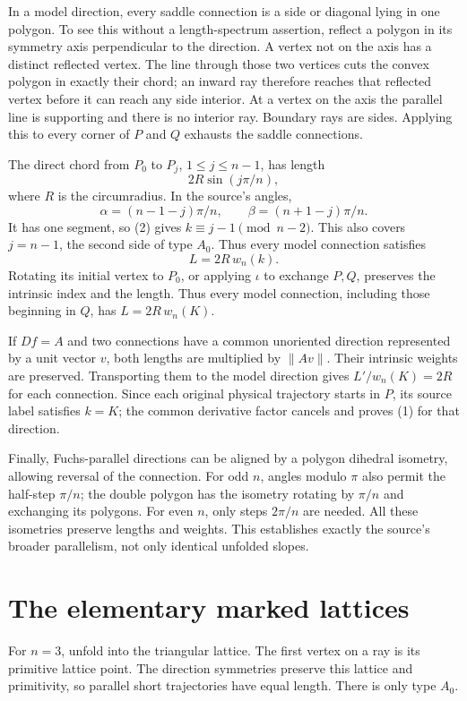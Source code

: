 \documentclass[11pt]{article}
\begin{document}
In a model direction, every saddle connection is a side or diagonal lying in one polygon. To see this without a length-spectrum assertion, reflect a polygon in its symmetry axis perpendicular to the direction. A vertex not on the axis has a distinct reflected vertex. The line through those two vertices cuts the convex polygon in exactly their chord; an inward ray therefore reaches that reflected vertex before it can reach any side interior. At a vertex on the axis the parallel line is supporting and there is no interior ray. Boundary rays are sides. Applying this to every corner of \(P\) and \(Q\) exhausts the saddle connections.

The direct chord from \(P_0\) to \(P_j\), \(1\le j\le n-1\), has length
\[
2R\sin(j\pi/n),
\tag{11}
\]
where \(R\) is the circumradius. In the source's angles,
\[
\alpha=(n-1-j)\pi/n,\qquad
\beta=(n+1-j)\pi/n.
\]
It has one segment, so (2) gives \(k\equiv j-1\pmod{n-2}\). This also covers \(j=n-1\), the second side of type \(A_0\). Thus every model connection satisfies
\[
L=2R\,w_n(k).
\tag{12}
\]
Rotating its initial vertex to \(P_0\), or applying \(\iota\) to exchange \(P,Q\), preserves the intrinsic index and the length. Thus every model connection, including those beginning in \(Q\), has \(L=2R\,w_n(K)\).

If \(D f=A\) and two connections have a common unoriented direction represented by a unit vector \(v\), both lengths are multiplied by \(\|Av\|\). Their intrinsic weights are preserved. Transporting them to the model direction gives \(L'/w_n(K)=2R\) for each connection. Since each original physical trajectory starts in \(P\), its source label satisfies \(k=K\); the common derivative factor cancels and proves (1) for that direction.

Finally, Fuchs-parallel directions can be aligned by a polygon dihedral isometry, allowing reversal of the connection. For odd \(n\), angles modulo \(\pi\) also permit the half-step \(\pi/n\); the double polygon has the isometry rotating by \(\pi/n\) and exchanging its polygons. For even \(n\), only steps \(2\pi/n\) are needed. All these isometries preserve lengths and weights. This establishes exactly the source's broader parallelism, not only identical unfolded slopes.

\section{The elementary marked lattices}

For \(n=3\), unfold into the triangular lattice. The first vertex on a ray is its primitive lattice point. The direction symmetries preserve this lattice and primitivity, so parallel short trajectories have equal length. There is only type \(A_0\).
\end{document}
